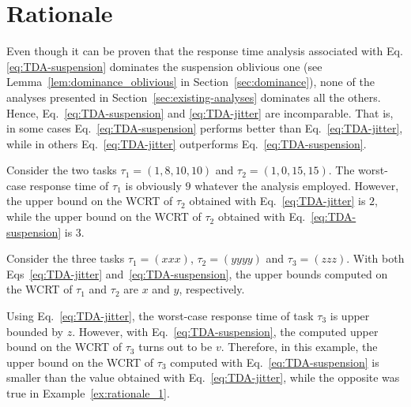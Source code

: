 \section{Rationale}
\label{sec:rationale}

Even though it can be proven that the response time analysis associated with Eq.\eqref{eq:TDA-suspension} dominates the suspension oblivious one (see Lemma~\ref{lem:dominance_oblivious} in Section~\ref{sec:dominance}), none of the analyses presented in Section~\ref{sec:existing-analyses} dominates all the others. Hence, Eq.~\eqref{eq:TDA-suspension} and \ref{eq:TDA-jitter} are incomparable. That is, in some cases Eq.~\eqref{eq:TDA-suspension} performs better than Eq.~\eqref{eq:TDA-jitter}, while in others Eq.~\eqref{eq:TDA-jitter} outperforms Eq.~\eqref{eq:TDA-suspension}.

\begin{example} 
\label{ex:rationale_1}  
Consider the two tasks $\tau_1 = (1, 8, 10, 10)$ and $\tau_2 = (1, 0, 15, 15)$. The worst-case response time of $\tau_1$ is obviously $9$ whatever the analysis employed. However, the upper bound on the WCRT of $\tau_2$ obtained with Eq.~\eqref{eq:TDA-jitter} is $2$, while 
the upper bound on the WCRT of $\tau_2$ obtained with Eq.~\eqref{eq:TDA-suspension} is $3$. %
\end{example}

\begin{example}   
Consider the three tasks $\tau_1 = (xxx)$, $\tau_2 = (yyyy)$ and $\tau_3 = (zzz)$. With both Eqs~\eqref{eq:TDA-jitter} and~\eqref{eq:TDA-suspension}, the upper bounds computed on the WCRT of $\tau_1$ and $\tau_2$ are $x$ and $y$, respectively. 

Using Eq.~\eqref{eq:TDA-jitter}, the worst-case response time of task $\tau_3$ is upper bounded by $z$. %
However, with Eq.~\eqref{eq:TDA-suspension}, the computed upper bound on the WCRT of $\tau_3$ turns out to be $v$. %
Therefore, in this example, the upper bound on the WCRT of $\tau_3$ computed with Eq.~\eqref{eq:TDA-suspension} is smaller than the value obtained with Eq.~\eqref{eq:TDA-jitter}, while the opposite was true in Example~\ref{ex:rationale_1}. 
\end{example}


